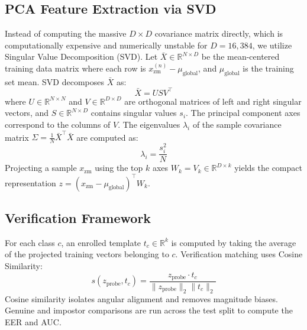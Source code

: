 \documentclass[conference]{IEEEtran}
\begin{document}
\subsection{PCA Feature Extraction via SVD}
Instead of computing the massive $D \times D$ covariance matrix directly, which is computationally expensive and numerically unstable for $D=16,384$, we utilize Singular Value Decomposition (SVD). Let $\bar{X} \in \mathbb{R}^{N \times D}$ be the mean-centered training data matrix where each row is $x_{\text{zm}}^{(n)} - \mu_{\text{global}}$, and $\mu_{\text{global}}$ is the training set mean. SVD decomposes $\bar{X}$ as:
\begin{equation}
    \bar{X} = U S V^\top
    \label{eq:svd}
\end{equation}
where $U \in \mathbb{R}^{N \times N}$ and $V \in \mathbb{R}^{D \times D}$ are orthogonal matrices of left and right singular vectors, and $S \in \mathbb{R}^{N \times D}$ contains singular values $s_i$. The principal component axes correspond to the columns of $V$. The eigenvalues $\lambda_i$ of the sample covariance matrix $\Sigma = \frac{1}{N} \bar{X}^\top \bar{X}$ are computed as:
\begin{equation}
    \lambda_i = \frac{s_i^2}{N}
    \label{eq:eigenvalues}
\end{equation}
Projecting a sample $x_{\text{zm}}$ using the top $k$ axes $W_k = V_k \in \mathbb{R}^{D \times k}$ yields the compact representation $z = (x_{\text{zm}} - \mu_{\text{global}})^\top W_k$.

\subsection{Verification Framework}
For each class $c$, an enrolled template $t_c \in \mathbb{R}^k$ is computed by taking the average of the projected training vectors belonging to $c$. Verification matching uses Cosine Similarity:
\begin{equation}
    s(z_{\text{probe}}, t_c) = \frac{z_{\text{probe}} \cdot t_c}{\|z_{\text{probe}}\|_2 \|t_c\|_2}
    \label{eq:cosine}
\end{equation}
Cosine similarity isolates angular alignment and removes magnitude biases. Genuine and impostor comparisons are run across the test split to compute the EER and AUC.
\end{document}
